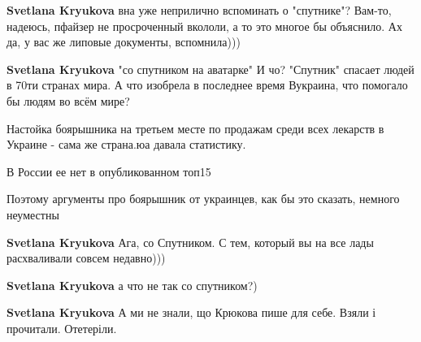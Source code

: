 \begin{itemize}
\begin{itemize}
\textbf{Svetlana Kryukova} вна уже неприлично вспоминать о "спутнике"? Вам-то, надеюсь, пфайзер не просроченный вкололи, а то это многое бы объяснило. Ах да, у вас же липовые документы, вспомнила)))

 
\textbf{Svetlana Kryukova}
"со спутником на аватарке"
И чо? "Спутник" спасает людей в 70ти странах мира. А что изобрела в последнее время Вукраина, что помогало бы людям во всём мире?

 

Настойка боярышника на третьем месте по продажам среди всех лекарств в Украине
- сама же страна.юа давала статистику.

В России ее нет в опубликованном топ15

Поэтому аргументы про боярышник от украинцев, как бы это сказать, немного
неуместны


 
\textbf{Svetlana Kryukova} Ага, со Спутником. С тем, который вы на все лады расхваливали совсем недавно)))

 
\textbf{Svetlana Kryukova} а что не так со спутником?)

 
\textbf{Svetlana Kryukova} А ми не знали, що Крюкова пише для себе. Взяли і прочитали. Отетеріли.

 

\end{itemize}
\end{itemize}
